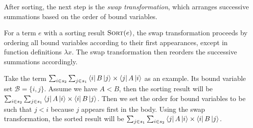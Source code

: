 After sorting, the next step is the \textit{swap transformation}, which arranges successive summations based on the order of bound variables.
\begin{definition}
For a term \( e \) with a sorting result \( \textsc{Sort}(e) \), the swap transformation proceeds by ordering all bound variables according to their first appearances, except in function definitions \( \lambda x \). The swap transformation then reorders the successive summations accordingly.
\end{definition}

Take the term $\sum_{i \in s_2} \sum_{j \in s_1} \bra{i} B \ket{j} \times \bra{j} A \ket{i}$ as an example. Its bound variable set $\mathcal{B} = \{i, j\}$. Assume we have $A < B$, then the sorting result will be $\sum_{i \in s_2} \sum_{j \in s_1} \bra{j} A \ket{i} \times \bra{i} B \ket{j}$. Then we set the order for bound variables to be such that $j < i$ because $j$ appears first in the body. Using the swap transformation, the sorted result will be $\sum_{j \in s_1} \sum_{i \in s_2} \bra{j} A \ket{i} \times \bra{i} B \ket{j}$.











